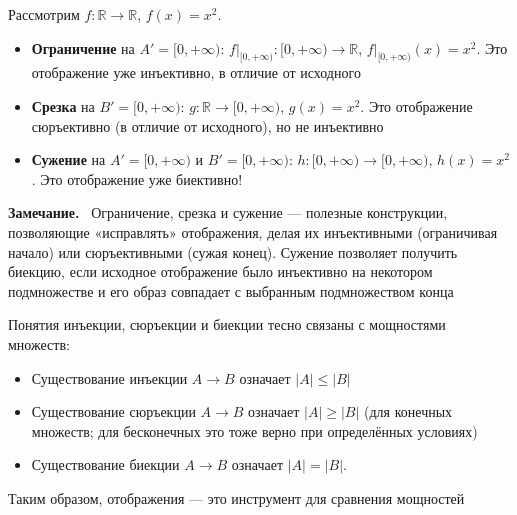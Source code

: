 \documentclass[a4paper,12pt]{article}
\newcommand{\myremark}{\textbf{Замечание.}\ }
\theoremstyle{definition}
\theoremstyle{plain}
\theoremstyle{remark}
\begin{document}
	\begin{tcolorbox}[colback=gray!5, colframe=gray!50, title=Примеры]
		Рассмотрим $f \colon \mathbb{R} \to \mathbb{R}$, $f(x) = x^2$.
		
		\begin{itemize}
			\item \textbf{Ограничение} на $A' = [0, +\infty)$: $f|_{[0, +\infty)} \colon [0, +\infty) \to \mathbb{R}$, $f|_{[0, +\infty)}(x) = x^2$. Это отображение уже инъективно, в отличие от исходного
			
			\item \textbf{Срезка} на $B' = [0, +\infty)$: $g \colon \mathbb{R} \to [0, +\infty)$, $g(x) = x^2$. Это отображение сюръективно (в отличие от исходного), но не инъективно
			
			\item \textbf{Сужение} на $A' = [0, +\infty)$ и $B' = [0, +\infty)$: $h \colon [0, +\infty) \to [0, +\infty)$, $h(x) = x^2$. Это отображение уже биективно!
		\end{itemize}
	\end{tcolorbox}
	
	\myremark
	Ограничение, срезка и сужение — полезные конструкции, позволяющие «исправлять» отображения, делая их инъективными (ограничивая начало) или сюръективными (сужая конец). Сужение позволяет получить биекцию, если исходное отображение было инъективно на некотором подмножестве и его образ совпадает с выбранным подмножеством конца
	
	\begin{tcolorbox}[colback=yellow!5, colframe=orange!60!black, title=Заметочка: Связь с предыдущими темами]
		Понятия инъекции, сюръекции и биекции тесно связаны с мощностями множеств:
		\begin{itemize}
			\item Существование инъекции $A \to B$ означает $|A| \leq |B|$
			\item Существование сюръекции $A \to B$ означает $|A| \geq |B|$ (для конечных множеств; для бесконечных это тоже верно при определённых условиях)
			\item Существование биекции $A \to B$ означает $|A| = |B|$.
		\end{itemize}
		Таким образом, отображения — это инструмент для сравнения мощностей
	\end{tcolorbox}
	
	
	
	
	
	
	
	
	
\end{document}
